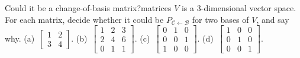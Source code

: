 \documentclass[11pt]{article}
\begin{document}
\begin{kc}{Could it be a change-of-basis matrix?}{matrices}
$V$ is a $3$-dimensional vector space. For each matrix, decide whether it could be $P_{\mathcal{C}\leftarrow\mathcal{B}}$ for two bases of $V$, and say why. (a)~$\begin{bmatrix}1&2\\3&4\end{bmatrix}$. (b)~$\begin{bmatrix}1&2&3\\2&4&6\\0&1&1\end{bmatrix}$. (c)~$\begin{bmatrix}0&1&0\\0&0&1\\1&0&0\end{bmatrix}$. (d)~$\begin{bmatrix}1&0&0\\0&1&0\\0&0&1\end{bmatrix}$.
\end{kc}
\end{document}

